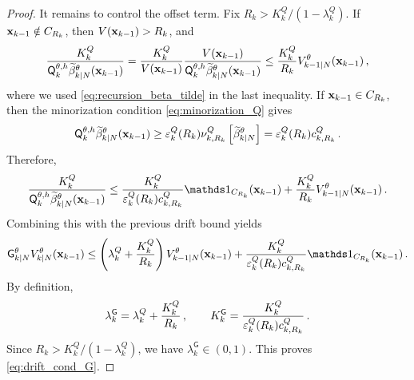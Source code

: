 \documentclass[11pt]{article}
\theoremstyle{plain}
\newtheorem{proposition}[theorem]{Proposition}
\theoremstyle{definition}
\theoremstyle{remark}
\begin{document}
\begin{proof}
It remains to control the offset term. Fix $R_k>K_k^Q/(1-\lambda_k^Q)$. If
$\mathbf{x}_{k-1}\notin C_{R_k}$, then $V(\mathbf{x}_{k-1})>R_k$, and
$$
\frac{ K_k^Q }{ \mk{k}[\theta,h] \widetilde \beta_{k|N}^{\theta} (\x_{k-1}) }
= \frac{ K_k^Q }{ V(\x_{k-1}) } \frac{ V(\x_{k-1}) }{ \mk{k}[\theta,h]\widetilde \beta_{k|N}^{\theta} (\x_{k-1}) } \le \frac{K_k^Q}{R_k} V_{k-1|N}^{\theta}(\x_{k-1}) \eqsp,
$$
where we used \eqref{eq:recursion_beta_tilde} in the last inequality. If $\mathbf{x}_{k-1}\in C_{R_k}$, then the minorization condition \eqref{eq:minorization_Q} gives
$$
\mk{k}[\theta,h] \widetilde \beta_{k|N}^{\theta} (\x_{k-1}) \ge \varepsilon^Q_k(R_k) \nu_{k,R_k}^Q \left[ \widetilde \beta_{k|N}^{\theta} \right] = \varepsilon^Q_k(R_k) c_{k,R_k}^Q \eqsp.
$$
Therefore,
$$
\frac{ K_k^Q }{ \mk{k}[\theta,h] \widetilde \beta_{k|N}^{\theta}(\x_{k-1}) } \le \frac{ K_k^Q }{ \varepsilon^Q_k(R_k) c_{k,R_k}^Q } \un_{C_{R_k}}(\x_{k-1}) + \frac{K_k^Q}{R_k} V_{k-1|N}^{\theta}(\x_{k-1}) \eqsp.
$$
Combining this with the previous drift bound yields
$$
\fsmk{k}{N}[\theta] V_{k|N}^{\theta} (\x_{k-1}) \le \left( \lambda_k^Q+\frac{K_k^Q}{R_k} \right) V_{k-1|N}^{\theta} (\x_{k-1})
+ \frac{ K_k^Q }{ \varepsilon^Q_k(R_k)c_{k,R_k}^Q } \un_{C_{R_k}} (\x_{k-1}) \eqsp.
$$
By definition,
$$
\lambda_k^{\mathsf G} = \lambda_k^Q+\frac{K_k^Q}{R_k} \,, \qquad K_k^{\mathsf G} = \frac{ K_k^Q }{ \varepsilon^Q_k(R_k)c_{k,R_k}^Q } \,.
$$
Since $R_k>K_k^Q/(1-\lambda_k^Q)$, we have $\lambda_k^{\mathsf G}\in(0,1)$. This proves \eqref{eq:drift_cond_G}.
\end{proof}

\end{document}
